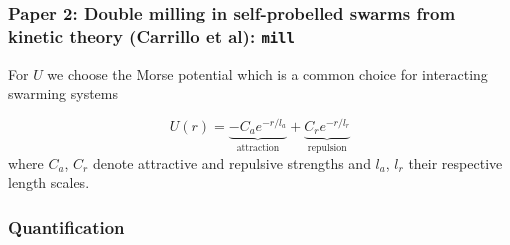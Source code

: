 \documentclass[compress]{beamer}
\begin{document}
\begin{frame}
	\frametitle{Paper 2: Double milling in self-probelled swarms from kinetic theory (Carrillo et al): \texttt{mill}}
	

For \( U \) we choose the Morse potential which is a common choice for interacting swarming systems

\begin{equation} \label{morsePotential}
U(r) = \underbrace{-C_{a} e^{-r/l_{a}}}_{\text{attraction}} + \underbrace{C_{r}e^{-r/l_{r}}}_{\text{repulsion}}
\end{equation}
where \( C_{a}\), \( C_{r}\) denote attractive and repulsive strengths and \( l_{a}\), \( l_{r}\) their respective length scales.
	
\end{frame}

\begin{frame}
  \frametitle{Quantification}
%
%
\end{frame}
\end{document}
